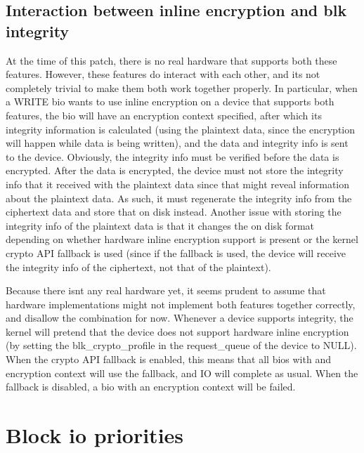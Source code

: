 \documentclass[a4paper,11pt,english]{sphinxmanual}
\begin{document}
\section{Interaction between inline encryption and blk integrity}
\label{\detokenize{inline-encryption:interaction-between-inline-encryption-and-blk-integrity}}
At the time of this patch, there is no real hardware that supports both these
features. However, these features do interact with each other, and it\textquotesingle{}s not
completely trivial to make them both work together properly. In particular,
when a WRITE bio wants to use inline encryption on a device that supports both
features, the bio will have an encryption context specified, after which
its integrity information is calculated (using the plaintext data, since
the encryption will happen while data is being written), and the data and
integrity info is sent to the device. Obviously, the integrity info must be
verified before the data is encrypted. After the data is encrypted, the device
must not store the integrity info that it received with the plaintext data
since that might reveal information about the plaintext data. As such, it must
re\sphinxhyphen{}generate the integrity info from the ciphertext data and store that on disk
instead. Another issue with storing the integrity info of the plaintext data is
that it changes the on disk format depending on whether hardware inline
encryption support is present or the kernel crypto API fallback is used (since
if the fallback is used, the device will receive the integrity info of the
ciphertext, not that of the plaintext).

Because there isn\textquotesingle{}t any real hardware yet, it seems prudent to assume that
hardware implementations might not implement both features together correctly,
and disallow the combination for now. Whenever a device supports integrity, the
kernel will pretend that the device does not support hardware inline encryption
(by setting the blk\_crypto\_profile in the request\_queue of the device to NULL).
When the crypto API fallback is enabled, this means that all bios with and
encryption context will use the fallback, and IO will complete as usual.  When
the fallback is disabled, a bio with an encryption context will be failed.


\chapter{Block io priorities}
\label{\detokenize{ioprio:block-io-priorities}}\label{\detokenize{ioprio::doc}}
\end{document}
